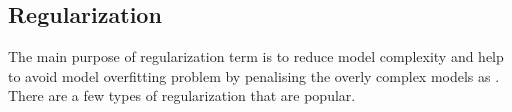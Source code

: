 \subsection{Regularization}

The main purpose of regularization term is to reduce model complexity and help to avoid model overfitting problem by penalising the overly complex models as . There are a few types of regularization that are popular. 